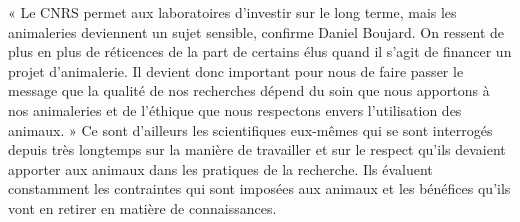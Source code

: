 \documentclass[8pt]{article}
\begin{document}
« Le CNRS permet aux laboratoires d’investir sur le long terme, mais les animaleries deviennent un sujet sensible, confirme Daniel Boujard. On ressent de plus en plus de réticences de la part de certains élus quand il s’agit de financer un projet d’animalerie. Il devient donc important pour nous de faire passer le message que la qualité de nos recherches dépend du soin que nous apportons à nos animaleries et de l’éthique que nous respectons envers l’utilisation des animaux. » Ce sont d’ailleurs les scientifiques eux-mêmes qui se sont interrogés depuis très longtemps sur la manière de travailler et sur le respect qu’ils devaient apporter aux animaux dans les pratiques de la recherche. Ils évaluent constamment les contraintes qui sont imposées aux animaux et les bénéfices qu’ils vont en retirer en matière de connaissances.
\end{document}
